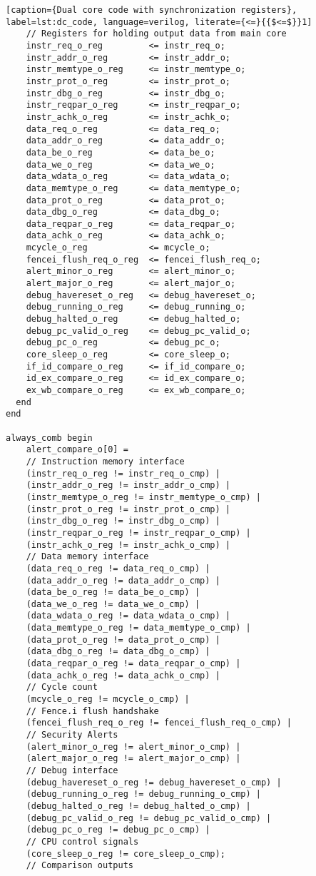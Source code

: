 \begin{lstlisting}[caption={Dual core code with synchronization registers}, label=lst:dc_code, language=verilog, literate={<=}{{$<=$}}1]
    // Registers for holding output data from main core 
    instr_req_o_reg         <= instr_req_o;
    instr_addr_o_reg        <= instr_addr_o;
    instr_memtype_o_reg     <= instr_memtype_o;
    instr_prot_o_reg        <= instr_prot_o;
    instr_dbg_o_reg         <= instr_dbg_o;
    instr_reqpar_o_reg      <= instr_reqpar_o;
    instr_achk_o_reg        <= instr_achk_o;
    data_req_o_reg          <= data_req_o;
    data_addr_o_reg         <= data_addr_o;
    data_be_o_reg           <= data_be_o;
    data_we_o_reg           <= data_we_o;
    data_wdata_o_reg        <= data_wdata_o;
    data_memtype_o_reg      <= data_memtype_o;
    data_prot_o_reg         <= data_prot_o;
    data_dbg_o_reg          <= data_dbg_o;
    data_reqpar_o_reg       <= data_reqpar_o;
    data_achk_o_reg         <= data_achk_o;
    mcycle_o_reg            <= mcycle_o;
    fencei_flush_req_o_reg  <= fencei_flush_req_o;
    alert_minor_o_reg       <= alert_minor_o;
    alert_major_o_reg       <= alert_major_o;
    debug_havereset_o_reg   <= debug_havereset_o;
    debug_running_o_reg     <= debug_running_o;
    debug_halted_o_reg      <= debug_halted_o;
    debug_pc_valid_o_reg    <= debug_pc_valid_o;
    debug_pc_o_reg          <= debug_pc_o;
    core_sleep_o_reg        <= core_sleep_o;
    if_id_compare_o_reg     <= if_id_compare_o;
    id_ex_compare_o_reg     <= id_ex_compare_o;
    ex_wb_compare_o_reg     <= ex_wb_compare_o;
  end 
end

always_comb begin
    alert_compare_o[0] = 
    // Instruction memory interface
    (instr_req_o_reg != instr_req_o_cmp) |
    (instr_addr_o_reg != instr_addr_o_cmp) |
    (instr_memtype_o_reg != instr_memtype_o_cmp) |
    (instr_prot_o_reg != instr_prot_o_cmp) |
    (instr_dbg_o_reg != instr_dbg_o_cmp) |
    (instr_reqpar_o_reg != instr_reqpar_o_cmp) |
    (instr_achk_o_reg != instr_achk_o_cmp) |
    // Data memory interface
    (data_req_o_reg != data_req_o_cmp) |
    (data_addr_o_reg != data_addr_o_cmp) |
    (data_be_o_reg != data_be_o_cmp) |
    (data_we_o_reg != data_we_o_cmp) |
    (data_wdata_o_reg != data_wdata_o_cmp) |
    (data_memtype_o_reg != data_memtype_o_cmp) |
    (data_prot_o_reg != data_prot_o_cmp) |
    (data_dbg_o_reg != data_dbg_o_cmp) |
    (data_reqpar_o_reg != data_reqpar_o_cmp) |
    (data_achk_o_reg != data_achk_o_cmp) |
    // Cycle count
    (mcycle_o_reg != mcycle_o_cmp) |
    // Fence.i flush handshake
    (fencei_flush_req_o_reg != fencei_flush_req_o_cmp) |
    // Security Alerts
    (alert_minor_o_reg != alert_minor_o_cmp) |
    (alert_major_o_reg != alert_major_o_cmp) |
    // Debug interface
    (debug_havereset_o_reg != debug_havereset_o_cmp) |
    (debug_running_o_reg != debug_running_o_cmp) |
    (debug_halted_o_reg != debug_halted_o_cmp) |
    (debug_pc_valid_o_reg != debug_pc_valid_o_cmp) |
    (debug_pc_o_reg != debug_pc_o_cmp) |
    // CPU control signals
    (core_sleep_o_reg != core_sleep_o_cmp);
    // Comparison outputs
    

\end{lstlisting}
